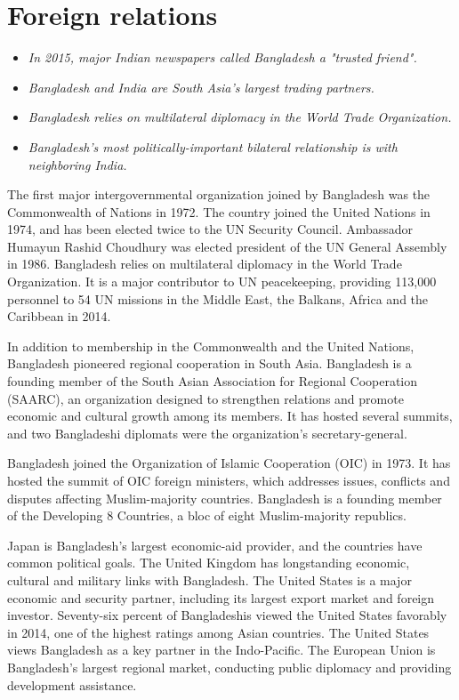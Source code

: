 \section{Foreign relations}\label{foreign-relations}

\begin{itemize}
\item
  \emph{In 2015, major Indian newspapers called Bangladesh a "trusted
  friend".}
\item
  \emph{Bangladesh and India are South Asia's largest trading partners.}
\item
  \emph{Bangladesh relies on multilateral diplomacy in the World Trade
  Organization.}
\item
  \emph{Bangladesh's most politically-important bilateral relationship
  is with neighboring India.}
\end{itemize}

The first major intergovernmental organization joined by Bangladesh was
the Commonwealth of Nations in 1972. The country joined the United
Nations in 1974, and has been elected twice to the UN Security Council.
Ambassador Humayun Rashid Choudhury was elected president of the UN
General Assembly in 1986. Bangladesh relies on multilateral diplomacy in
the World Trade Organization. It is a major contributor to UN
peacekeeping, providing 113,000 personnel to 54 UN missions in the
Middle East, the Balkans, Africa and the Caribbean in 2014.

In addition to membership in the Commonwealth and the United Nations,
Bangladesh pioneered regional cooperation in South Asia. Bangladesh is a
founding member of the South Asian Association for Regional Cooperation
(SAARC), an organization designed to strengthen relations and promote
economic and cultural growth among its members. It has hosted several
summits, and two Bangladeshi diplomats were the organization's
secretary-general.

Bangladesh joined the Organization of Islamic Cooperation (OIC) in 1973.
It has hosted the summit of OIC foreign ministers, which addresses
issues, conflicts and disputes affecting Muslim-majority countries.
Bangladesh is a founding member of the Developing 8 Countries, a bloc of
eight Muslim-majority republics.

Japan is Bangladesh's largest economic-aid provider, and the countries
have common political goals. The United Kingdom has longstanding
economic, cultural and military links with Bangladesh. The United States
is a major economic and security partner, including its largest export
market and foreign investor. Seventy-six percent of Bangladeshis viewed
the United States favorably in 2014, one of the highest ratings among
Asian countries. The United States views Bangladesh as a key partner in
the Indo-Pacific. The European Union is Bangladesh's largest regional
market, conducting public diplomacy and providing development
assistance.

